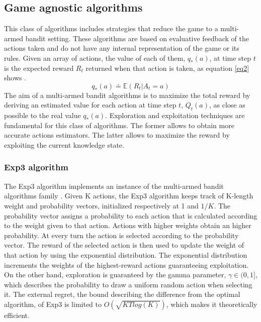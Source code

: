 \documentclass[runningheads]{llncs}
\begin{document}
\subsection{Game agnostic algorithms}
This class of algorithms includes strategies that reduce the game
to a multi-armed bandit setting. These algorithms are based on
evaluative feedback of the actions taken and do not have any internal
representation of the game or its rules. Given an array
of actions, the value of each of them, $q_*(a)$, at time step $t$ is the expected
reward $R_t$ returned when that action is taken, as equation \ref{eq2}
shows \cite{rlbook}.
\begin{equation}\label{eq2}
  q_*(a) \doteq \mathbb{E}(R_t | A_t = a)
\end{equation}
The aim of a multi-armed bandit algorithms is to maximize the total reward
by deriving an estimated value for each action at time step
$t$, $Q_t(a)$, as close as possible to the real value
$q_*(a)$. Exploration and exploitation techniques are fundamental for
this class of algorithms. The former allows to obtain more accurate
actions estimators. The latter allows to maximize the reward by
exploiting the current knowledge state.

\subsubsection{Exp3 algorithm}
The Exp3 algorithm implements an instance of the multi-armed bandit
algorithms family \cite{exp3}. Given K actions, the Exp3 algorithm keeps track of
K-length weight and probability vectors, initialized respectively at 1
and $1/K$. The probability vector assigns a probability to each action
that is calculated according to the weight given to that
action. Actions with higher weights obtain an higher probability. At
every turn the action is selected according to the probability
vector. The reward of the selected action is then used to update the
weight of that action by using the exponential distribution. The
exponential distribution increments the weights of the highest-reward
actions guaranteeing exploitation. On the other hand, exploration is
guaranteed by the gamma parameter, $\gamma \in (0, 1]$, which describes the probability to
draw a uniform random action when selecting it. The external regret, the bound
describing the difference from the optimal algorithm, of Exp3 is
limited to $O(\sqrt{KTlog(K)})$, which makes it theoretically
efficient.
\end{document}
